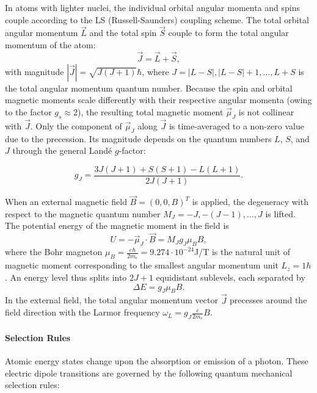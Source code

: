 \documentclass{article}
\begin{document}
In atoms with lighter nuclei, the individual orbital angular momenta and spins couple according to the LS (Russell-Saunders) coupling scheme. The total orbital angular momentum $\vec{L}$ and the total spin $\vec{S}$ couple to form the total angular momentum of the atom:
\begin{equation}
    \vec{J} = \vec{L} + \vec{S},
\end{equation}
with magnitude $|\vec{J}| = \sqrt{J(J+1)}\hbar$, where $J = |L-S|, |L-S|+1, \ldots, L+S$ is the total angular momentum quantum number. Because the spin and orbital magnetic moments scale differently with their respective angular momenta (owing to the factor $g_s \approx 2$), the resulting total magnetic moment $\vec{\mu}_J$ is not collinear with $\vec{J}$. Only the component of $\vec{\mu}_J$ along $\vec{J}$ is time-averaged to a non-zero value due to the precession. Its magnitude depends on the quantum numbers $L$, $S$, and $J$ through the general Landé $g$-factor:

\begin{equation}
    g_J = \frac{3J(J+1) + S(S+1) - L(L+1)}{2J(J+1)}.
    \label{eq:lande}
\end{equation}

When an external magnetic field $\vec{B} = (0, 0, B)^T$ is applied, the degeneracy with respect to the magnetic quantum number $M_J = -J, -(J-1), \ldots, J$ is lifted. The potential energy of the magnetic moment in the field is
\begin{equation}
    U = -\vec{\mu}_J \cdot \vec{B} = M_J g_J \mu_B B,
\end{equation}
where the Bohr magneton $\mu_B = \frac{e\hbar}{2m_e} = 9.274 \cdot 10^{-24}$J/T is the natural unit of magnetic moment corresponding to the smallest angular momentum unit $L_z = 1\hbar$. An energy level thus splits into $2J+1$ equidistant sublevels, each separated by
\begin{equation}
    \Delta E = g_J \mu_B B.
\end{equation}
In the external field, the total angular momentum vector $\vec{J}$ precesses around the field direction with the Larmor frequency $\omega_L = g_J\frac{e}{2m_e}B$.

\paragraph{Selection Rules}
Atomic energy states change upon the absorption or emission of a photon. These electric dipole transitions are governed by the following quantum mechanical selection rules:
\end{document}
